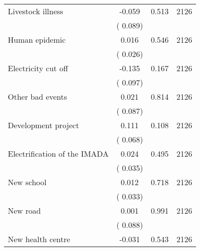 \begin{tabular}{l*{3}{c}}
 Livestock illness                 &             -0.059          &        0.513 & 2126          \\ 
                               &        (       0.089)             &                        &                              \\ 
 Human epidemic                &              0.016        &        0.546   & 2126              \\ 
                               &        (       0.026)            &                               &                               \\ 
 Electricity cut off                &             -0.135        &        0.167   & 2126              \\ 
                               &        (       0.097)            &                               &                               \\ 
 Other bad events                &              0.021        &        0.814   & 2126              \\ 
                               &        (       0.087)            &                               &                               \\ 
 Development project                &              0.111        &        0.108   & 2126              \\ 
                               &        (       0.068)            &                               &                               \\ 
 Electrification of the IMADA                &              0.024        &        0.495   & 2126              \\ 
                               &        (       0.035)            &                               &                               \\ 
 New school                &              0.012        &        0.718   & 2126              \\ 
                               &        (       0.033)            &                               &                               \\ 
 New road                &              0.001        &        0.991   & 2126              \\ 
                               &        (       0.088)            &                               &                               \\ 
 New health centre                &             -0.031        &        0.543   & 2126              \\ 

\end{tabular}
